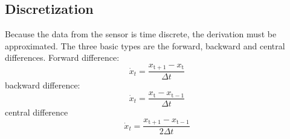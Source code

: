 \subsection{Discretization}
Because the data from the sensor is time discrete, the derivation must be approximated.
The three basic types are the forward, backward and central differences.
Forward difference:
\begin{equation}
	\dot{x}_t = \frac{x_\mathrm{t + 1} - x_\mathrm{t}}{\Delta t}
\end{equation}
backward difference:
\begin{equation}
	\dot{x}_t = \frac{x_\mathrm{t} - x_\mathrm{t - 1}}{\Delta t}
\end{equation}
central difference
\begin{equation}
	\dot{x}_t = \frac{x_\mathrm{t + 1} - x_\mathrm{t - 1}}{2\Delta t}
\end{equation}
